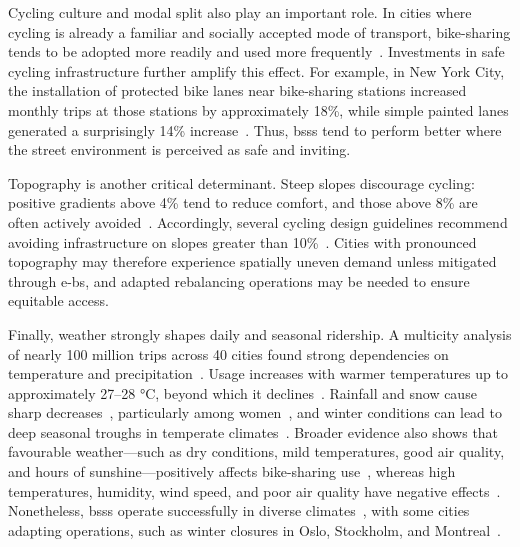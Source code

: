         Cycling culture and modal split also play an important role. In cities where cycling is already a familiar and socially accepted mode of transport, bike-sharing tends to be adopted more readily and used more frequently~\cite{Fishman2016, Willberg2021}. Investments in safe cycling infrastructure further amplify this effect. For example, in New York City, the installation of protected bike lanes near bike-sharing stations increased monthly trips at those stations by approximately 18\%, while simple painted lanes generated a surprisingly 14\% increase~\cite{Moran2025}. Thus, \acp{bss} tend to perform better where the street environment is perceived as safe and inviting.


        Topography is another critical determinant. Steep slopes discourage cycling: positive gradients above 4\% tend to reduce comfort, and those above 8\% are often actively avoided~\cite{Midgley2011}. Accordingly, several cycling design guidelines recommend avoiding infrastructure on slopes greater than 10\%~\cite{AASHTO1999bicycle, CycleHighways2025, CROW2006}. Cities with pronounced topography may therefore experience spatially uneven demand unless mitigated through \acp{e-b}, and adapted rebalancing operations may be needed to ensure equitable access.

        Finally, weather strongly shapes daily and seasonal ridership. A multicity analysis of nearly 100 million trips across 40 cities found strong dependencies on temperature and precipitation~\cite{Bean2021}. Usage increases with warmer temperatures up to approximately 27–28 °C, beyond which it declines~\cite{Julio2022}. Rainfall and snow cause sharp decreases~\cite{Bean2021, Wang2021, Julio2022}, particularly among women~\cite{Nahal2018}, and winter conditions can lead to deep seasonal troughs in temperate climates~\cite{Julio2022}. Broader evidence also shows that favourable weather—such as dry conditions, mild temperatures, good air quality, and hours of sunshine—positively affects bike-sharing use~\cite{Corcoran2014, FaghihImani2014, Gebhart2014, Caulfield2017, Campbell2016}, whereas high temperatures, humidity, wind speed, and poor air quality have negative effects~\cite{Campbell2016, Corcoran2014, Caulfield2017}. Nonetheless, \acp{bss} operate successfully in diverse climates~\cite{OBIS2011, Yanocha2018}, with some cities adapting operations, such as winter closures in Oslo, Stockholm, and Montreal~\cite{OBIS2011}.


